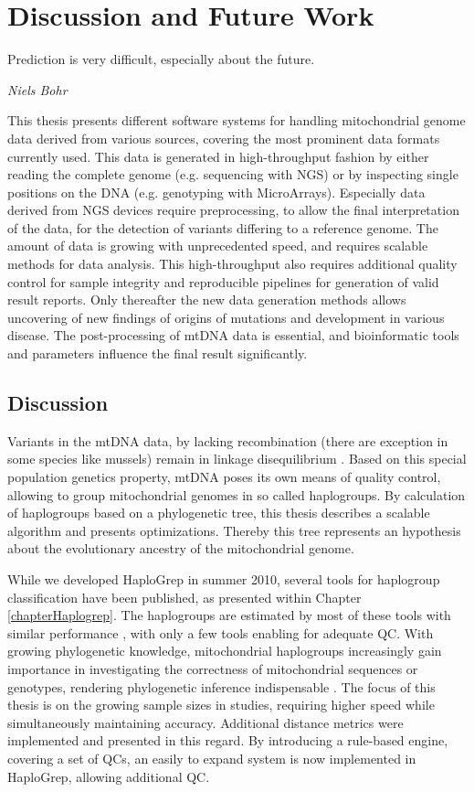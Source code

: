 \chapter{Discussion and Future Work}
\label{outlook}
\epigraph{Prediction is very difficult, especially about the future.}{\textit{Niels Bohr}}
This thesis presents different software systems for handling mitochondrial genome data derived from various sources, covering the most prominent data formats currently used. This data is generated in high-throughput fashion by either reading the complete genome (e.g. sequencing with NGS) or by inspecting single positions on the DNA (e.g. genotyping with MicroArrays). Especially data derived from NGS devices require preprocessing, to allow the final interpretation of the data, for the detection of variants differing to a reference genome. The amount of data is growing with unprecedented speed, and requires scalable methods for data analysis. This high-throughput also requires additional quality control for sample integrity and reproducible pipelines for generation of valid result reports. Only thereafter the new data generation methods allows uncovering of new findings of origins of mutations and development in various disease. The post-processing of mtDNA data is essential, and bioinformatic tools and parameters influence the final result significantly. 
\section{Discussion}
\label{disc:sec1}
Variants in the mtDNA data, by lacking recombination (there are exception in some species like mussels) remain in linkage disequilibrium \cite{Wallace2013}. Based on this special population genetics property, mtDNA poses its own means of quality control, allowing to group mitochondrial genomes in so called haplogroups. By calculation of haplogroups based on a phylogenetic tree, this thesis describes a scalable algorithm and presents optimizations.  Thereby this tree represents an hypothesis about the evolutionary ancestry of the mitochondrial genome. 

While we developed HaploGrep in summer 2010, several tools for haplogroup classification  have been published, as presented within Chapter \ref{chapterHaplogrep}. The haplogroups are estimated by most of these tools with similar performance \cite{Bandelt2012}, with only a few tools enabling for adequate QC. With growing phylogenetic knowledge, mitochondrial haplogroups increasingly gain importance in investigating the correctness of mitochondrial sequences or genotypes, rendering phylogenetic inference indispensable \cite{Weissensteiner2016a}. The focus of this thesis is on the growing sample sizes in studies, requiring higher speed while simultaneously maintaining accuracy. 
Additional distance metrics were implemented and presented in this regard. By introducing a rule-based engine, covering a set of QCs, an easily to expand system is now implemented in HaploGrep, allowing additional QC. 

